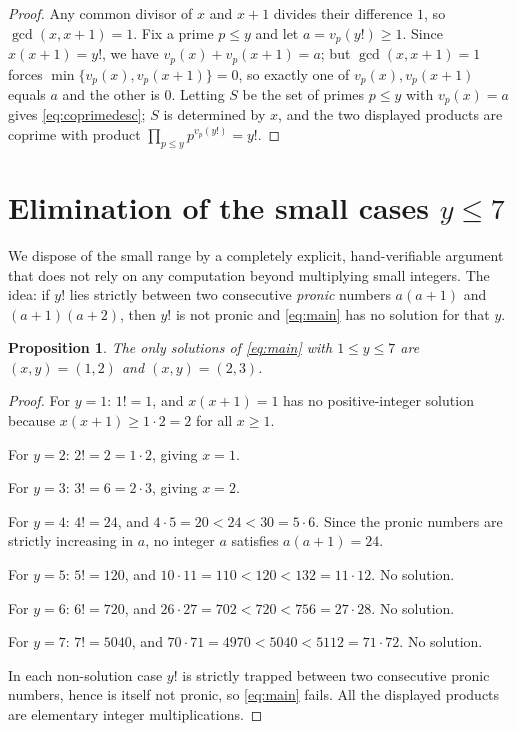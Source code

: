 \documentclass{amsart}
\theoremstyle{plain}
\newtheorem{proposition}{Proposition}
\theoremstyle{remark}
\begin{document}
\begin{proof}
Any common divisor of $x$ and $x+1$ divides their difference $1$, so
$\gcd(x,x+1)=1$.  Fix a prime $p\le y$ and let $a=v_p(y!)\ge1$.  Since
$x(x+1)=y!$, we have $v_p(x)+v_p(x+1)=a$; but $\gcd(x,x+1)=1$ forces
$\min\{v_p(x),v_p(x+1)\}=0$, so exactly one of $v_p(x),v_p(x+1)$ equals $a$
and the other is $0$.  Letting $S$ be the set of primes $p\le y$ with
$v_p(x)=a$ gives \eqref{eq:coprimedesc}; $S$ is determined by $x$, and the
two displayed products are coprime with product $\prod_{p\le y}p^{v_p(y!)}=y!$.
\end{proof}

\section{Elimination of the small cases $y\le 7$}\label{sec:small}

We dispose of the small range by a completely explicit, hand-verifiable
argument that does not rely on any computation beyond multiplying small
integers.  The idea: if $y!$ lies strictly between two consecutive
\emph{pronic} numbers $a(a+1)$ and $(a+1)(a+2)$, then $y!$ is not pronic and
\eqref{eq:main} has no solution for that $y$.

\begin{proposition}\label{prop:small}
The only solutions of \eqref{eq:main} with $1\le y\le 7$ are $(x,y)=(1,2)$
and $(x,y)=(2,3)$.
\end{proposition}

\begin{proof}
For $y=1$: $1!=1$, and $x(x+1)=1$ has no positive-integer solution because
$x(x+1)\ge 1\cdot2=2$ for all $x\ge1$.

For $y=2$: $2!=2=1\cdot2$, giving $x=1$.

For $y=3$: $3!=6=2\cdot3$, giving $x=2$.

For $y=4$: $4!=24$, and $4\cdot5=20<24<30=5\cdot6$. Since the pronic numbers
are strictly increasing in $a$, no integer $a$ satisfies $a(a+1)=24$.

For $y=5$: $5!=120$, and $10\cdot11=110<120<132=11\cdot12$. No solution.

For $y=6$: $6!=720$, and $26\cdot27=702<720<756=27\cdot28$. No solution.

For $y=7$: $7!=5040$, and $70\cdot71=4970<5040<5112=71\cdot72$. No solution.

In each non-solution case $y!$ is strictly trapped between two consecutive
pronic numbers, hence is itself not pronic, so \eqref{eq:main} fails.  All
the displayed products are elementary integer multiplications.
\end{proof}
\end{document}
